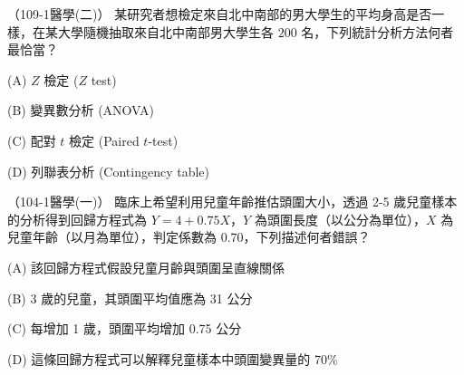    \begin{docexam}{（109-1醫學(二)）}
        某研究者想檢定來自北中南部的男大學生的平均身高是否一樣，在某大學隨機抽取來自北中南部男大學生各 $200$ 名，下列統計分析方法何者最恰當？

        (A) $Z$ 檢定 ($Z$ test)
        
        (B) 變異數分析 (ANOVA)

        (C) 配對 $t$ 檢定 (Paired $t$-test)
 
        (D) 列聯表分析 (Contingency table)
    \end{docexam}
    
    \begin{docexam}{（104-1醫學(一)）}
        臨床上希望利用兒童年齡推估頭圍大小，透過 2-5 歲兒童樣本的分析得到回歸方程式為 $Y = 4 + 0.75X$，$Y$ 為頭圍長度（以公分為單位），$X$ 為兒童年齡（以月為單位），判定係數為 $0.70$，下列描述何者錯誤？

        (A) 該回歸方程式假設兒童月齡與頭圍呈直線關係
        
        (B) 3 歲的兒童，其頭圍平均值應為 31 公分

        (C) 每增加 1 歲，頭圍平均增加 0.75 公分
 
        (D) 這條回歸方程式可以解釋兒童樣本中頭圍變異量的 70\%
    \end{docexam}